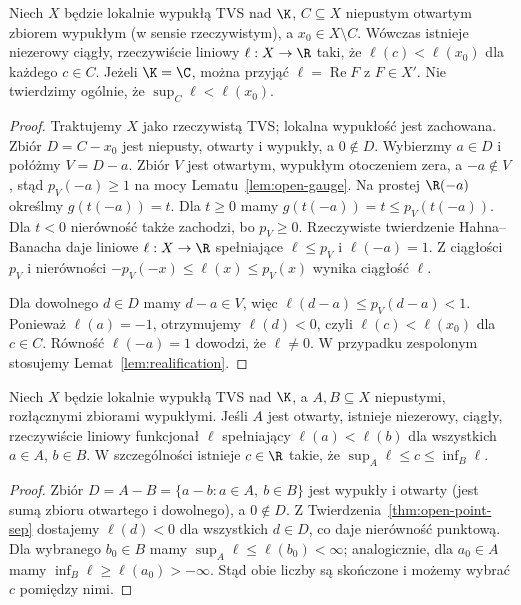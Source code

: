 \begin{twierdzenie}
\label{thm:open-point-sep}
Niech $X$ będzie lokalnie wypukłą TVS nad $\K$,
$C\subseteq X$ niepustym otwartym zbiorem wypukłym
(w sensie rzeczywistym), a $x_0\in X\setminus C$.
Wówczas istnieje niezerowy ciągły, rzeczywiście liniowy
$\ell:X\to\R$ taki, że $\ell(c)<\ell(x_0)$
dla każdego $c\in C$. Jeżeli $\K=\C$, można przyjąć
$\ell=\operatorname{Re}F$ z $F\in X'$.
Nie twierdzimy ogólnie, że $\sup_C\ell<\ell(x_0)$.
\end{twierdzenie}
\begin{proof}
Traktujemy $X$ jako rzeczywistą TVS; lokalna wypukłość
jest zachowana. Zbiór $D=C-x_0$ jest niepusty, otwarty
i wypukły, a $0\notin D$. Wybierzmy $a\in D$ i połóżmy
$V=D-a$. Zbiór $V$ jest otwartym, wypukłym otoczeniem zera,
a $-a\notin V$, stąd $p_V(-a)\ge1$ na mocy
Lematu~\ref{lem:open-gauge}. Na prostej $\R(-a)$
określmy $g(t(-a))=t$. Dla $t\ge0$ mamy
$g(t(-a))=t\le p_V(t(-a))$. Dla $t<0$ nierówność
także zachodzi, bo $p_V\ge0$. Rzeczywiste twierdzenie
Hahna--Banacha daje liniowe $\ell:X\to\R$ spełniające
$\ell\le p_V$ i $\ell(-a)=1$. Z ciągłości $p_V$
i nierówności $-p_V(-x)\le\ell(x)\le p_V(x)$
wynika ciągłość $\ell$.

Dla dowolnego $d\in D$ mamy $d-a\in V$, więc
$\ell(d-a)\le p_V(d-a)<1$. Ponieważ $\ell(a)=-1$,
otrzymujemy $\ell(d)<0$, czyli
$\ell(c)<\ell(x_0)$ dla $c\in C$. Równość
$\ell(-a)=1$ dowodzi, że $\ell\ne0$. W przypadku
zespolonym stosujemy Lemat~\ref{lem:realification}.
\end{proof}

\begin{twierdzenie}
\label{thm:open-two-sep}
Niech $X$ będzie lokalnie wypukłą TVS nad $\K$,
a $A,B\subseteq X$ niepustymi, rozłącznymi zbiorami wypukłymi.
Jeśli $A$ jest otwarty, istnieje niezerowy, ciągły, rzeczywiście
liniowy funkcjonał $\ell$ spełniający
$\ell(a)<\ell(b)$ dla wszystkich $a\in A$, $b\in B$.
W szczególności istnieje $c\in\R$ takie, że
$\sup_A\ell\le c\le\inf_B\ell$.
\end{twierdzenie}
\begin{proof}
Zbiór $D=A-B=\{a-b:a\in A,\ b\in B\}$ jest wypukły
i otwarty (jest sumą zbioru otwartego i dowolnego),
a $0\notin D$. Z Twierdzenia~\ref{thm:open-point-sep}
dostajemy $\ell(d)<0$ dla wszystkich $d\in D$,
co daje nierówność punktową. Dla wybranego $b_0\in B$
mamy $\sup_A\ell\le\ell(b_0)<\infty$; analogicznie,
dla $a_0\in A$ mamy $\inf_B\ell\ge\ell(a_0)>-\infty$.
Stąd obie liczby są skończone i możemy wybrać $c$
pomiędzy nimi.
\end{proof}

